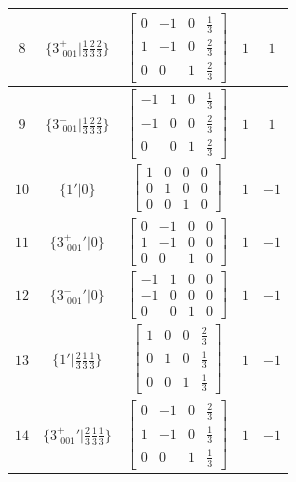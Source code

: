 \documentclass[fleqn,8pt]{jsarticle}
\begin{document}
\begin{longtable}{ccccc}
$ 8 $ & $ \{3^{+}_{\,\,001}|\frac{1}{3} \frac{2}{3} \frac{2}{3}\} $ & $ \begin{bmatrix} 0 & -1 & 0 & \frac{1}{3} \\ 1 & -1 & 0 & \frac{2}{3} \\ 0 & 0 & 1 & \frac{2}{3} \end{bmatrix} $ & $ 1 $ & $ 1 $ \\ \hline
$ 9 $ & $ \{3^{-}_{\,\,001}|\frac{1}{3} \frac{2}{3} \frac{2}{3}\} $ & $ \begin{bmatrix} -1 & 1 & 0 & \frac{1}{3} \\ -1 & 0 & 0 & \frac{2}{3} \\ 0 & 0 & 1 & \frac{2}{3} \end{bmatrix} $ & $ 1 $ & $ 1 $ \\ \hline
$ 10 $ & $ \{1{}'|0\} $ & $ \begin{bmatrix} 1 & 0 & 0 & 0 \\ 0 & 1 & 0 & 0 \\ 0 & 0 & 1 & 0 \end{bmatrix} $ & $ 1 $ & $ -1 $ \\ \hline
$ 11 $ & $ \{3^{+}_{\,\,001}{}'|0\} $ & $ \begin{bmatrix} 0 & -1 & 0 & 0 \\ 1 & -1 & 0 & 0 \\ 0 & 0 & 1 & 0 \end{bmatrix} $ & $ 1 $ & $ -1 $ \\ \hline
$ 12 $ & $ \{3^{-}_{\,\,001}{}'|0\} $ & $ \begin{bmatrix} -1 & 1 & 0 & 0 \\ -1 & 0 & 0 & 0 \\ 0 & 0 & 1 & 0 \end{bmatrix} $ & $ 1 $ & $ -1 $ \\ \hline
$ 13 $ & $ \{1{}'|\frac{2}{3} \frac{1}{3} \frac{1}{3}\} $ & $ \begin{bmatrix} 1 & 0 & 0 & \frac{2}{3} \\ 0 & 1 & 0 & \frac{1}{3} \\ 0 & 0 & 1 & \frac{1}{3} \end{bmatrix} $ & $ 1 $ & $ -1 $ \\ \hline
$ 14 $ & $ \{3^{+}_{\,\,001}{}'|\frac{2}{3} \frac{1}{3} \frac{1}{3}\} $ & $ \begin{bmatrix} 0 & -1 & 0 & \frac{2}{3} \\ 1 & -1 & 0 & \frac{1}{3} \\ 0 & 0 & 1 & \frac{1}{3} \end{bmatrix} $ & $ 1 $ & $ -1 $ \\ \hline

\end{longtable}
\end{document}
